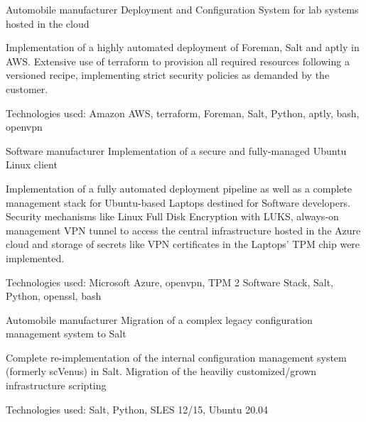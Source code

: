 

\begin{cventries}
  \cventry
    {Automobile manufacturer}
    {Deployment and Configuration System for lab systems hosted in the cloud}
    {}
    {}
    {
      \begin{cvitems}
      \item Implementation of a highly automated deployment of Foreman, Salt and aptly in AWS.
        Extensive use of terraform to provision all required resources following a versioned recipe,
        implementing strict security policies as demanded by the customer.
      \item Technologies used: Amazon AWS, terraform, Foreman, Salt, Python, aptly, bash, openvpn
      \end{cvitems}
    }
  \cventry
    {Software manufacturer}
    {Implementation of a secure and fully-managed Ubuntu Linux client}
    {}
    {}
    {
      \begin{cvitems}
      \item Implementation of a fully automated deployment pipeline as well as a complete management
        stack for Ubuntu-based Laptops destined for Software developers. Security mechanisms like
        Linux Full Disk Encryption with LUKS, always-on management VPN tunnel to access the central
        infrastructure hosted in the Azure cloud and storage of secrets
        like VPN certificates in the Laptops' TPM chip were implemented.
      \item Technologies used: Microsoft Azure, openvpn, TPM 2 Software Stack, Salt, Python,
        openssl, bash
      \end{cvitems}
    }
  \cventry
    {Automobile manufacturer}
    {Migration of a complex legacy configuration management system to Salt}
    {}
    {}
    {
      \begin{cvitems}
      \item Complete re-implementation of the internal configuration management
        system (formerly scVenus) in Salt. Migration of the heaviliy customized/grown infrastructure
        scripting
      \item Technologies used: Salt, Python, SLES 12/15, Ubuntu 20.04

\end{cvitems}}
\end{cventries}

